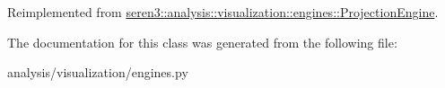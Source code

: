 Reimplemented from \hyperlink{classseren3_1_1analysis_1_1visualization_1_1engines_1_1ProjectionEngine_a42f12a0ccc166799a59549d9fe672f2b}{seren3::analysis::visualization::engines::ProjectionEngine}.

The documentation for this class was generated from the following file:\begin{DoxyCompactItemize}
\item 
analysis/visualization/engines.py\end{DoxyCompactItemize}
